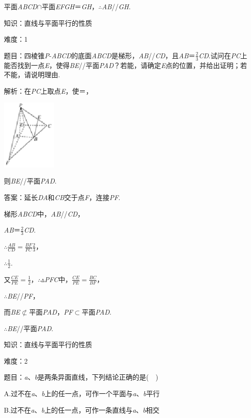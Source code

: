 \documentclass{article} %
\begin{document}
平面\textit{ABCD}$\mathrm{\cap}$平面\textit{EFGH}＝\textit{GH}，$\mathrm{\therefore}$\textit{AB}//\textit{GH}.

知识：直线与平面平行的性质

难度：1

题目：四棱锥\textit{P}-\textit{ABCD}的底面\textit{ABCD}是梯形，\textit{AB}//\textit{CD}，且\textit{AB}＝$\frac{2}{3}$\textit{CD}.试问在\textit{PC}上能否找到一点\textit{E}，使得\textit{BE}//平面\textit{PAD}？若能，请确定\textit{E}点的位置，并给出证明；若不能，请说明理由.

解析：在\textit{PC}上取点\textit{E}，使＝，

\includegraphics*[width=1.08in, height=1.39in, keepaspectratio=false]{image166}

则\textit{BE}//平面\textit{PAD}.

答案：延长\textit{DA}和\textit{CB}交于点\textit{F}，连接\textit{PF}.

梯形\textit{ABCD}中，\textit{AB}//\textit{CD}，

\textit{AB}＝$\frac{2}{3}$\textit{CD}.

$\mathrm{\therefore}\frac{AB}{CD}=\frac{BF}{FC}\frac{2}{3}$，

$\mathrm{\therefore}\frac{1}{2}$.

又$\frac{CE}{PE}=\frac{1}{2}$，$\mathrm{\therefore}$$\mathrm{\vartriangle}$\textit{PFC}中，$\frac{CE}{PE}=\frac{BC}{BF}$，

$\mathrm{\therefore}$\textit{BE}//\textit{PF}，

而\textit{BE}$\mathrm{\nsubset}$平面\textit{PAD}，\textit{PF}$\mathrm{\subset }$平面\textit{PAD}.

$\mathrm{\therefore}$\textit{BE}//平面\textit{PAD}.

知识：直线与平面平行的性质

难度：2

题目：\textit{a}、\textit{b}是两条异面直线，下列结论正确的是(　)

A.过不在\textit{a}、\textit{b}上的任一点，可作一个平面与\textit{a}、\textit{b}平行

B.过不在\textit{a}、\textit{b}上的任一点，可作一条直线与\textit{a}、\textit{b}相交
\end{document}
